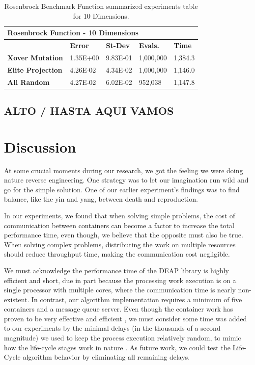 \documentclass[graybox]{svmult}
\begin{document}
            \begin{table}[]
                \scriptsize
                \centering
                \caption{Rosenbrock Benchmark Function summarized experiments table for 10 Dimensions.}\label{tab.fun_rosenbrock10}        
                \begin{tabular}{@{}lllll@{}}
                \toprule
                \multicolumn{5}{l}{\textbf{Rosenbrock Function - 10 Dimensions}} \\ \midrule
                & \textbf{Error} & \textbf{St-Dev} & \textbf{Evals.} & \textbf{Time} \\
                \textbf{Xover Mutation} & 1.35E+00 & 9.83E-01 & 1,000,000 & 1,384.3 \\
                \textbf{Elite Projection} & 4.26E-02 & 4.34E-02 & 1,000,000 & 1,146.0 \\
                \textbf{All Random} & 4.27E-02 & 6.02E-02 & 952,038 & 1,147.8 \\ \bottomrule
                \end{tabular}
                \end{table}


    \subsection{ALTO / HASTA AQUI VAMOS}

\section{Discussion}
\label{section.discussion}

At some crucial moments during our research, we got the feeling we were doing
nature reverse engineering. One strategy was to let our imagination run wild
and go for the simple solution. One of our earlier experiment's findings was to
find balance, like the yin and yang, between death and reproduction.

In our experiments, we found that when solving simple problems, the cost of
communication between containers can become a factor to increase the total
performance time, even though, we believe that the opposite must also be true.
When solving complex problems, distributing the work on multiple resources
should reduce throughput time, making the communication cost negligible.

We must acknowledge the performance time of the DEAP library
\cite{fortin2012deap} is highly efficient and short, due in part because the
processing work execution is on a single processor with multiple cores, where
the communication time is nearly non-existent. In contrast, our algorithm
implementation requires a minimum of five containers and a message queue
server. Even though the container work has proven to be very effective and
efficient \cite{merelo2016performance,valdez2021container}, we must consider
some time was added to our experiments by the minimal delays (in the thousands
of a second magnitude) we used to keep the process execution relatively random,
to mimic how the life-cycle stages work in nature \cite{read1968system}. As
future work, we could test the Life-Cycle algorithm behavior by eliminating all
remaining delays.
\end{document}
